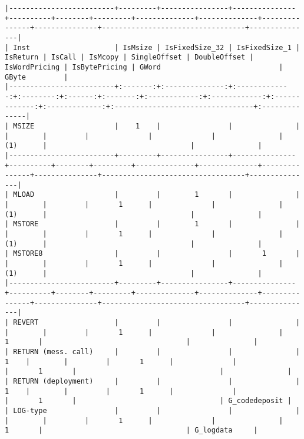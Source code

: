 \documentclass[varwidth=\maxdimen,margin=0.5cm,multi={verbatim}]{standalone}
\begin{document}
\begin{verbatim}
|-------------------------+---------+----------------+---------------+----------+--------+---------+--------------+--------------+---------------+---------------+----------------------------------+---------------|
| Inst                    | IsMsize | IsFixedSize_32 | IsFixedSize_1 | IsReturn | IsCall | IsMcopy | SingleOffset | DoubleOffset | IsWordPricing | IsBytePricing | GWord                            | GByte         |
|-------------------------+:-------:+:--------------:+:-------------:+:--------:+:------:+:-------:+:------------:+:------------:+:-------------:+:-------------:+:---------------------------------+:--------------|
| MSIZE                   |    1    |                |               |          |        |         |              |              |               |      (1)      |                                  |               |
|-------------------------+---------+----------------+---------------+----------+--------+---------+--------------+--------------+---------------+---------------+----------------------------------+---------------|
| MLOAD                   |         |        1       |               |          |        |         |       1      |              |               |      (1)      |                                  |               |
| MSTORE                  |         |        1       |               |          |        |         |       1      |              |               |      (1)      |                                  |               |
| MSTORE8                 |         |                |       1       |          |        |         |       1      |              |               |      (1)      |                                  |               |
|-------------------------+---------+----------------+---------------+----------+--------+---------+--------------+--------------+---------------+---------------+----------------------------------+---------------|
| REVERT                  |         |                |               |          |        |         |       1      |              |               |       1       |                                  |               |
| RETURN (mess. call)     |         |                |               |     1    |        |         |       1      |              |               |       1       |                                  |               |
| RETURN (deployment)     |         |                |               |     1    |        |         |       1      |              |               |       1       |                                  | G_codedeposit |
| LOG-type                |         |                |               |          |        |         |       1      |              |               |       1       |                                  | G_logdata     |

\end{verbatim}
\end{document}
